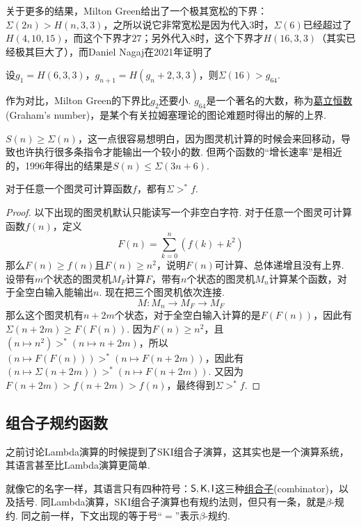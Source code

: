关于更多的结果，Milton Green给出了一个极其宽松的下界：\(\Sigma(2n)>H(n,3,3)\)，之所以说它非常宽松是因为代入\(3\)时，\(\Sigma(6)\)已经超过了\(H(4,10,15)\)，而这个下界才\(27\)；另外代入\(8\)时，这个下界才\(H(16,3,3)\)（其实已经极其巨大了），而Daniel Nagaj在2021年证明了
\begin{center}
    设\(g_1 = H(6,3,3)\)，\(g_{n+1} = H(g_n+2,3,3)\)，则\(\Sigma(16)>g_{64}\).
\end{center}
作为对比，Milton Green的下界比\(g_2\)还要小. \(g_{64}\)是一个著名的大数，称为\underline{葛立恒数}(Graham's number)，是某个有关拉姆塞理论的图论难题时得出的解的上界.

\(S(n) \geq \Sigma(n)\)，这一点很容易想明白，因为图灵机计算的时候会来回移动，导致也许执行很多条指令才能输出一个较小的数. 但两个函数的“增长速率”是相近的，1996年得出的结果是\(S(n) \leq \Sigma(3n+6)\).

\begin{proposition}{}
    对于任意一个图灵可计算函数\(f\)，都有\(\Sigma >^* f\).
\end{proposition}

\begin{proof}
    以下出现的图灵机默认只能读写一个非空白字符. 对于任意一个图灵可计算函数\(f(n)\)，定义
    \[F(n) = \sum_{k=0}^n(f(k)+k^2)\]
    那么\(F(n) \geq f(n)\)且\(F(n) \geq n^2\)，说明\(F(n)\)可计算、总体递增且没有上界. 设带有\(m\)个状态的图灵机\(M_F\)计算\(F\)，带有\(n\)个状态的图灵机\(M_n\)计算某个函数，对于全空白输入能输出\(n\). 现在把三个图灵机依次连接.
    \[M: M_n \to M_F \to M_F\]
    那么这个图灵机有\(n+2m\)个状态，对于全空白输入计算的是\(F(F(n))\)，因此有\(\Sigma(n+2m) \geq F(F(n))\). 因为\(F(n) \geq n^2\)，且\((n \mapsto n^2) >^* (n \mapsto n+2m)\)，所以\((n \mapsto F(F(n))) >^* (n \mapsto F(n+2m))\)，因此有\((n \mapsto \Sigma(n+2m)) >^*(n \mapsto F(n+2m)) \). 又因为\(F(n+2m) > f(n+2m) > f(n)\)，最终得到\(\Sigma >^* f\).
\end{proof}

\subsection{组合子规约函数}

之前讨论Lambda演算的时候提到了SKI组合子演算，这其实也是一个演算系统，其语言甚至比Lambda演算更简单. 

就像它的名字一样，其语言只有四种符号：\({\sf S},{\sf K},{\sf I}\)这三种\underline{组合子}(combinator)，以及括号. 同Lambda演算，SKI组合子演算也有规约法则，但只有一条，就是\(\beta\)-规约. 同之前一样，下文出现的等于号“\(=\)”表示\(\beta\)-规约. 

